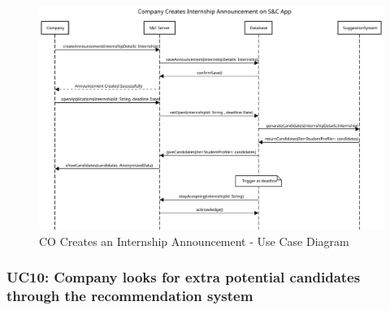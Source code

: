 \begin{figure}[H]
    \centering
    \includegraphics[width=1.0\textwidth]{Images/UC_9.pdf}
    \caption{CO Creates an Internship Announcement - Use Case Diagram}
    \label{fig:use-case-diagram-9}
\end{figure}


\subsubsection{UC10: Company looks for extra potential candidates through the recommendation system}
\label{subsubsec:company-looks-for-extra-potential-candidates-through-the-recommendation-system}

